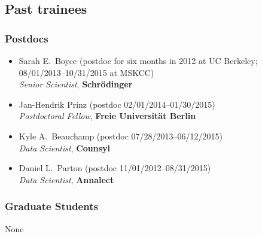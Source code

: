 \documentclass[10pt]{article}
\begin{document}
\eject

\subsection*{Past trainees}

\subsubsection*{Postdocs}

\begin{itemize}
  \item Sarah E.~Boyce (postdoc for six months in 2012 at UC Berkeley;\\
  08/01/2013--10/31/2015 at MSKCC)\\
  \emph{Senior Scientist},  {\bf Schr\"{o}dinger}
  
  \item Jan-Hendrik Prinz (postdoc 02/01/2014--01/30/2015)\\
  \emph{Postdoctoral Fellow}, {\bf Freie Universit\"{a}t Berlin}
  
  \item Kyle A.~Beauchamp (postdoc 07/28/2013--06/12/2015)\\
  \emph{Data Scientist}, {\bf Counsyl}
  
  \item Daniel L.~Parton (postdoc 11/01/2012--08/31/2015)\\
  \emph{Data Scientist}, {\bf Annalect}
  
\end{itemize}

\subsubsection*{Graduate Students}

None

\eject



\end{document}
